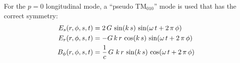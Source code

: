 For the $p = 0$ longitudinal mode, a ``pseudo TM$_{010}$'' mode is used that has the correct symmetry:
\begin{align}
  E_s(r, \phi, s, t)    &= 2 \, G \,                        \sin(k \, s) \, \sin(\omega \, t + 2 \, \pi \, \phi) \nonumber \\
  E_r(r, \phi, s, t)    &= -G \, k \, r \,                  \cos(k \, s) \, \sin(\omega \, t + 2 \, \pi \, \phi) \\
  B_\phi(r, \phi, s, t) &= \frac{1}{c} \, G \, \, k \, r \, \sin(k \, s) \, \cos(\omega \, t + 2 \, \pi \, \phi) \nonumber
  \label{egot3}
\end{align}

